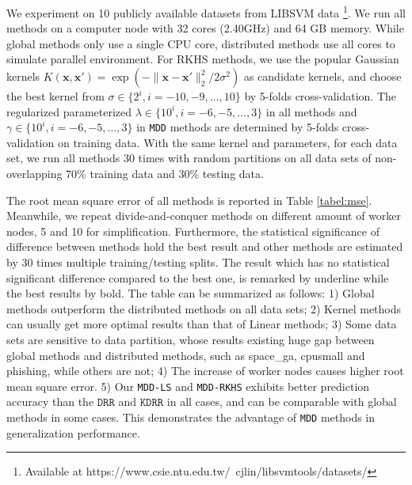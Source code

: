 \documentclass{article}
\begin{document}
We experiment on 10 publicly available datasets from LIBSVM data
\footnote{Available at https://www.csie.ntu.edu.tw/~cjlin/libsvmtools/datasets/}.
We run all methods on a computer node with 32 cores (2.40GHz) and 64 GB memory.
While global methods only use a single CPU core, distributed methods use all cores to simulate parallel environment.
For RKHS methods, we use the popular Gaussian kernels $K(\mathbf{x}, \mathbf{x}')=\exp(-{\|\mathbf{x}-\mathbf{x}'\|_2^2}/{2\sigma^2})$
as candidate kernels, and choose the best kernel from $\sigma \in \{2^i, i=-10, -9, \dots, 10\}$ by 5-folds cross-validation.
The regularized parameterized $\lambda \in \{10^i, i=-6,-5,\dots,3\}$ in all methods and $\gamma \in \{10^i, i=-6,-5,\dots,3\}$
in \texttt{MDD} methods are determined by 5-folds cross-validation on training data.
With the same kernel and parameters, for each data set,  we run all methods 30 times with random partitions on all data
sets of non-overlapping 70\% training data and 30\% testing data.

The root mean square error of all methods is reported in Table \ref{tabel:mse}. Meanwhile, we repeat divide-and-conquer methods on different amount of worker nodes, 5 and 10 for simplification. Furthermore, the statistical significance of difference between methods hold the best result and other methods are estimated by 30 times multiple training/testing splits. The result which has no statistical significant difference compared to the best one, is remarked by underline while the best results by bold.
The table can be summarized as follows:
1) Global methods outperform the distributed methods on all data sets;
2) Kernel methods can usually get more optimal results than that of Linear methods;
3) Some data sets are sensitive to data partition, whose results existing huge gap between global methods and distributed methods,
such as space\_ga, cpusmall and phishing, while others are not;
4) The increase of worker nodes causes higher root mean square error.
5) Our \texttt{MDD-LS} and \texttt{MDD-RKHS} exhibits better prediction accuracy than the $\texttt{DRR}$ and $\texttt{KDRR}$ in all cases, and can be comparable with global methods in some cases. This demonstrates the advantage of \texttt{MDD} methods in generalization performance.
\end{document}
